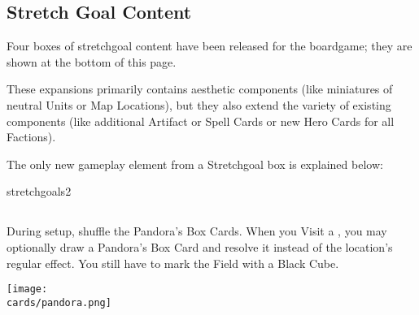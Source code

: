 \newpage
\begin{multicols}{2}

\subsection*{Stretch Goal Content}

Four boxes of stretchgoal content have been released for the boardgame; they are shown at the bottom of this page.\par
These expansions primarily contains aesthetic components (like miniatures of neutral Units or Map Locations), but they also extend the variety of existing components (like additional Artifact or Spell Cards or new Hero Cards for all Factions).\par
\smallskip

The only new gameplay element from a Stretchgoal box is explained below:\par
\vspace*{1em}
 \begin{expansion}{stretchgoals2}
   \subsection*{}
   During setup, shuffle the Pandora's Box Cards.
   When you Visit a , you may optionally draw a Pandora's Box Card and resolve it instead of the location's regular effect.
   You still have to mark the Field with a Black Cube.

   \medskip
   \begin{center}
     \texttt{[image: \\cards/pandora.png]}
   \end{center}
 \end{expansion}
 \vspace*{\fill}
 \columnbreak

\end{multicols}
